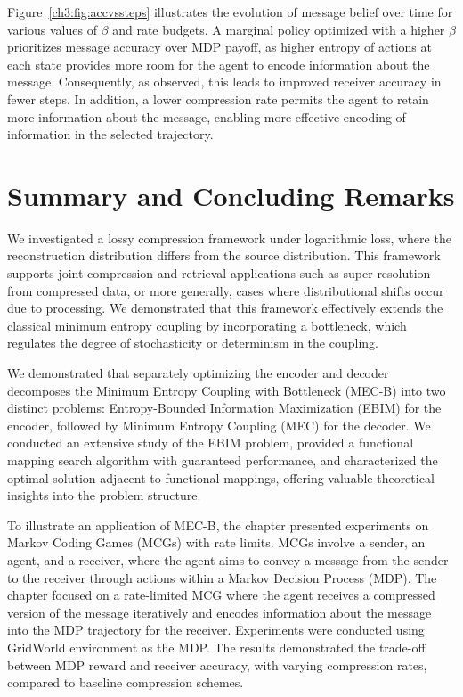 Figure~\ref{ch3:fig:accvssteps} illustrates the evolution of message belief over time for various values of \(\beta\) and rate budgets. A marginal policy optimized with a higher \(\beta\) prioritizes message accuracy over MDP payoff, as higher entropy of actions at each state provides more room for the agent to encode information about the message. Consequently, as observed, this leads to improved receiver accuracy in fewer steps. In addition, a lower compression rate permits the agent to retain more information about the message, enabling more effective encoding of information in the selected trajectory.


\FloatBarrier

\section{Summary and Concluding Remarks}

We investigated a lossy compression framework under logarithmic loss, where the reconstruction distribution differs from the source distribution. This framework supports joint compression and retrieval applications such as super-resolution from compressed data, or more generally, cases where distributional shifts occur due to processing. We demonstrated that this framework effectively extends the classical minimum entropy coupling by incorporating a bottleneck, which regulates the degree of stochasticity or determinism in the coupling.

We demonstrated that separately optimizing the encoder and decoder decomposes the Minimum Entropy Coupling with Bottleneck (MEC-B) into two distinct problems: Entropy-Bounded Information Maximization (EBIM) for the encoder, followed by Minimum Entropy Coupling (MEC) for the decoder. We conducted an extensive study of the EBIM problem, provided a functional mapping search algorithm with guaranteed performance, and characterized the optimal solution adjacent to functional mappings, offering valuable theoretical insights into the problem structure.

To illustrate an application of MEC-B, the chapter presented experiments on Markov Coding Games (MCGs) with rate limits. MCGs involve a sender, an agent, and a receiver, where the agent aims to convey a message from the sender to the receiver through actions within a Markov Decision Process (MDP). The chapter focused on a rate-limited MCG where the agent receives a compressed version of the message iteratively and encodes information about the message into the MDP trajectory for the receiver. Experiments were conducted using GridWorld environment as the MDP. The results demonstrated the trade-off between MDP reward and receiver accuracy, with varying compression rates, compared to baseline compression schemes.


